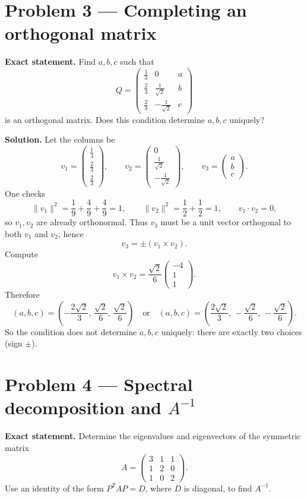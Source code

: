 \documentclass[12pt,a4paper]{article}
\theoremstyle{plain}
\theoremstyle{definition}      %
\begin{document}
\section*{Problem 3 — Completing an orthogonal matrix}

\textbf{Exact statement.}
Find $a,b,c$ such that
\[
Q=\begin{pmatrix}
	\frac13&0&a\\[2pt]
	\frac23&\frac1{\sqrt2}&b\\[2pt]
	\frac23&-\frac1{\sqrt2}&c
\end{pmatrix}
\]
is an orthogonal matrix. Does this condition determine $a,b,c$ uniquely?

\textbf{Solution.}
Let the columns be
\[
v_1=\begin{pmatrix}\frac13\\\frac23\\\frac23\end{pmatrix},\qquad
v_2=\begin{pmatrix}0\\\frac1{\sqrt2}\\-\frac1{\sqrt2}\end{pmatrix},\qquad
v_3=\begin{pmatrix}a\\b\\c\end{pmatrix}.
\]
One checks
\[
\|v_1\|^2=\frac19+\frac49+\frac49=1,\qquad
\|v_2\|^2=\frac12+\frac12=1,\qquad
v_1\cdot v_2=0,
\]
so $v_1,v_2$ are already orthonormal.
Thus $v_3$ must be a unit vector orthogonal to both $v_1$ and $v_2$, hence
\[
v_3=\pm(v_1\times v_2).
\]
Compute
\[
v_1\times v_2=\frac{\sqrt2}{6}\begin{pmatrix}-4\\1\\1\end{pmatrix}.
\]
Therefore
\[
(a,b,c)=\left(-\frac{2\sqrt2}{3},\,\frac{\sqrt2}{6},\,\frac{\sqrt2}{6}\right)
\quad\text{or}\quad
(a,b,c)=\left(\frac{2\sqrt2}{3},\,-\frac{\sqrt2}{6},\,-\frac{\sqrt2}{6}\right).
\]
So the condition does not determine $a,b,c$ uniquely: there are exactly two choices (sign $\pm$).

\section*{Problem 4 — Spectral decomposition and $A^{-1}$}

\textbf{Exact statement.}
Determine the eigenvalues and eigenvectors of the symmetric matrix
\[
A=\begin{pmatrix}
	3&1&1\\
	1&2&0\\
	1&0&2
\end{pmatrix}.
\]
Use an identity of the form $P^TAP=D$, where $D$ is diagonal, to find $A^{-1}$.
\end{document}
